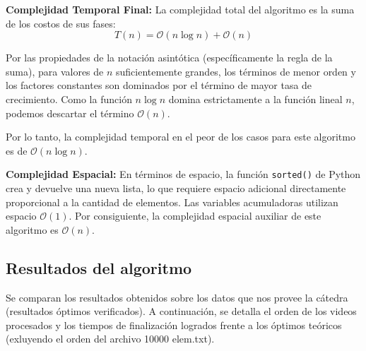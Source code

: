 \textbf{Complejidad Temporal Final:}
La complejidad total del algoritmo es la suma de los costos de sus fases:
\[ T(n) = \mathcal{O}(n \log n) + \mathcal{O}(n) \]

Por las propiedades de la notación asintótica (específicamente la regla de la suma), para valores de $n$ suficientemente grandes, los términos de menor orden y los factores constantes son dominados por el término de mayor tasa de crecimiento. Como la función $n \log n$ domina estrictamente a la función lineal $n$, podemos descartar el término $\mathcal{O}(n)$.

Por lo tanto, la complejidad temporal en el peor de los casos para este algoritmo es de \textbf{$\mathcal{O}(n \log n)$}.

\textbf{Complejidad Espacial:}
En términos de espacio, la función \texttt{sorted()} de Python crea y devuelve una nueva lista, lo que requiere espacio adicional directamente proporcional a la cantidad de elementos. Las variables acumuladoras utilizan espacio $\mathcal{O}(1)$. Por consiguiente, la complejidad espacial auxiliar de este algoritmo es $\mathcal{O}(n)$.

\subsection{Resultados del algoritmo}

Se comparan los resultados obtenidos sobre los datos que nos provee la cátedra (resultados óptimos verificados). A continuación, se detalla el orden de los videos procesados y los tiempos de finalización logrados frente a los óptimos teóricos (exluyendo el orden del archivo 10000 elem.txt).

